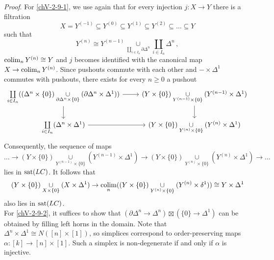         \emph{Proof}. For \ref{chV-2-9-1}, we use again that for every injection $j \colon X \to Y$ there is a filtration
        \begin{equation*}
            X = Y^{(-1)} \subseteq Y^{(0)} \subseteq Y^{(1)} \subseteq Y^{(2)} \subseteq \ldots \subseteq Y
            \end{equation*}
         such that
        \begin{equation*}
            Y^{(n)} \cong Y^{(n-1)} \underset{\coprod_{i \in I_n} \partial \Delta^n}{\cup} \coprod_{i \in I_n} \Delta^n \,,
        \end{equation*}
        $\operatorname*{colim}_n Y^{(n)} \cong Y$ and $j$ becomes identified with the canonical map $X \to \operatorname*{colim}_n Y^{(n)}$. Since pushouts commute with each other and $- \times \Delta^1$ commutes with pushouts, there exists for every $n \geq 0$ a pushout
        \begin{equation*}
            \begin{tikzcd}
                \coprod\limits_{i \in I_n} ((\Delta^n \times \{0\}) \underset{\partial \Delta^n \times \{0\}}{\cup} (\partial \Delta^n \times \Delta^1)) \arrow[r] \arrow[d] & (Y \times \{0\}) \underset{Y^{(n-1)} \times \{0\}}{\cup} (Y^{(n-1)} \times \Delta^1) \arrow[d] \\
                \coprod\limits_{i \in I_n} (\Delta^n \times \Delta^1) \arrow[r] & (Y \times \{0\}) \underset{Y^{(n)} \times \{0\}}{\cup} (Y^{(n)} \times \Delta^1)
            \end{tikzcd}
        \end{equation*}
        Consequently, the sequence of maps
        \begin{equation*}
            \ldots \rightarrow (Y \times \{0\}) \underset{Y^{(n-1)} \times \{0\}}{\cup} (Y^{(n-1)} \times \Delta^1) \rightarrow (Y \times \{0\}) \underset{Y^{(n)} \times \{0\}}{\cup} (Y^{(n)} \times \Delta^1) \rightarrow \ldots
        \end{equation*}
        lies in $\operatorname{sat}(LC)$. It follows that
        \begin{equation*}
            (Y \times \{0\}) \underset{X \times \{0\}}{\cup} (X \times \Delta^1) \rightarrow \operatorname*{colim}\limits_{n} ((Y \times \{0\}) \underset{Y^{(n)} \times \{0\}}{\cup} (Y^{(n)} \times \delta^1)) \cong Y \times \Delta^1
        \end{equation*}
        also lies in $\operatorname{sat}(LC)$.\\
        For \ref{chV-2-9-2}, it suffices to show that $(\partial \Delta^n \to \Delta^n) \boxtimes (\{0\} \to \Delta^1)$ can be obtained by filling left horns in the domain. Note that $\Delta^n \times \Delta^1 \cong N([n] \times [1])$, so simplices correspond to order-preserving maps $\alpha \colon [k] \to [n] \times [1]$. Such a simplex is non-degenerate if and only if $\alpha$ is injective.\\
